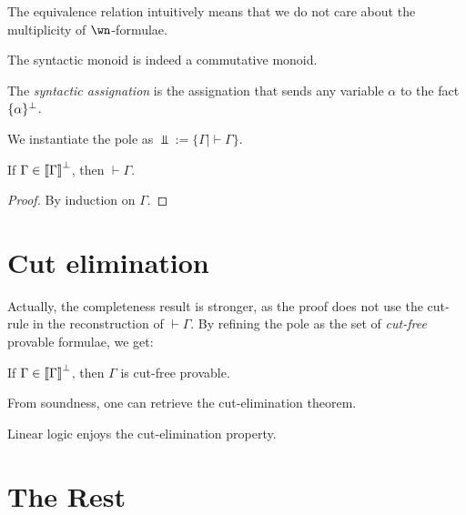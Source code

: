 The equivalence relation intuitively means that we do not care about the
multiplicity of \(\wn\)-formulae.

\begin{lemma}
The syntactic monoid is indeed a commutative monoid.
\end{lemma}

\begin{definition}
The \emph{syntactic assignation} is the assignation that sends any variable $\alpha$ to the fact $\{\alpha\}^\bot$.
\end{definition}

We instantiate the pole as \(\Bot := \{\Gamma \mid \vdash\Gamma\}\).

\begin{theorem}
If $\Gamma\in\left\llbracket \Gamma\right\rrbracket^\bot$, then $\vdash\Gamma$.
\end{theorem}

\begin{proof}
By induction on $\Gamma$.
\end{proof}

\section{Cut elimination}\label{cut-elimination}

Actually, the completeness result is stronger, as the proof does not use
the cut-rule in the reconstruction of \(\vdash\Gamma\). By refining the
pole as the set of \emph{cut-free} provable formulae, we get:

\begin{theorem}
If $\Gamma\in\left\llbracket \Gamma\right\rrbracket^\bot$, then $\Gamma$ is cut-free provable.
\end{theorem}

From soundness, one can retrieve the cut-elimination theorem.

\begin{corollary}
Linear logic enjoys the cut-elimination property.
\end{corollary}

\section{The Rest}\label{the-rest}




